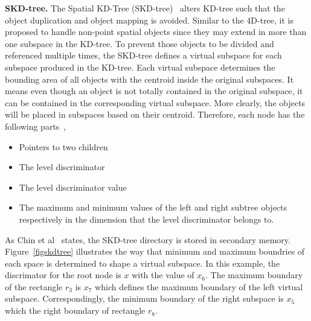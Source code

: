 \documentclass[a4paper,12pt]{article}
\begin{document}
\textbf{SKD-tree.} The Spatial KD-Tree (SKD-tree)~\cite{skdtree} alters KD-tree such that the object duplication and object mapping is avoided. Similar to the 4D-tree, it is proposed to handle non-point spatial objects since they may extend in more than one subspace in the KD-tree. To prevent those objects to be divided and referenced multiple times, the SKD-tree defines a virtual subspace for each subspace produced in the KD-tree. Each virtual subspace determines the bounding area of all objects with the centroid inside the original subspaces. It means even though an object is not totally contained in the original subspace, it can be contained in the corresponding virtual subspace. More clearly, the objects will be placed in subspaces based on their centroid. Therefore, each node has the following parts~\cite{skdtreebook},
\begin{itemize}
\item Pointers to two children
\item The level discriminator
\item The level discriminator value
\item The maximum and minimum values of the left and right subtree objects respectively in the dimension that the level discriminator belongs to.
\end{itemize}    
As Chin et al~\cite{survey} states, the SKD-tree directory is stored in secondary memory. Figure~\ref{figskdtree} illustrates the way that minimum and maximum boundries of each space is determined to shape a virtual subspace. In this example, the discrimator for the root node is $x$ with the value of $x_6$.
The maximum boundary of the rectangle $r_3$ is $x_7$ which defines the maximum boundary of the left virtual subspace. Correspondingly, the minimum boundary of the right subspace is $x_5$ which the right boundary of rectangle $r_8$.
\end{document}

